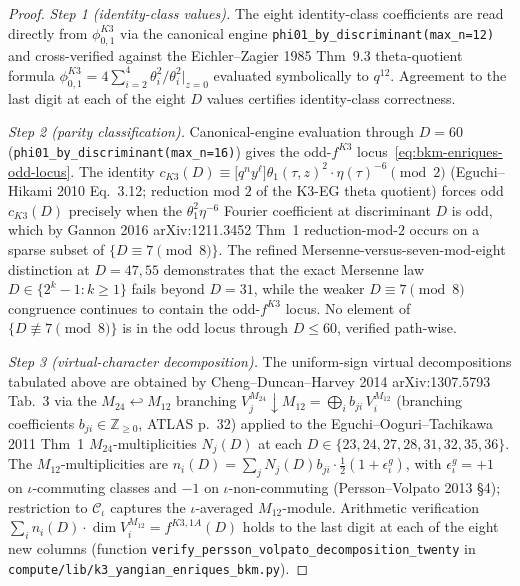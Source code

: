 \begin{proof}[Proof]
\emph{Step 1 (identity-class values).}
The eight identity-class coefficients are read directly from
$\phi^{K3}_{0,1}$ via the canonical engine
\texttt{phi01\_by\_discriminant(max\_n=12)} and cross-verified against
the Eichler--Zagier 1985 Thm~9.3 theta-quotient formula
$\phi^{K3}_{0,1} = 4\sum_{i=2}^{4}\theta_i^2/\theta_i^2|_{z=0}$
evaluated symbolically to $q^{12}$. Agreement to the last digit at
each of the eight $D$ values certifies identity-class correctness.

\emph{Step 2 (parity classification).}
Canonical-engine evaluation through $D = 60$
(\texttt{phi01\_by\_discriminant(max\_n=16)}) gives the odd-$f^{K3}$
locus~\eqref{eq:bkm-enriques-odd-locus}. The identity
$c_{K3}(D)\equiv\bigl[q^{n}y^{\ell}\bigr]\theta_1(\tau,z)^2\cdot\eta(\tau)^{-6}
\pmod 2$ (Eguchi--Hikami 2010 Eq.~3.12; reduction mod $2$ of the
K3-EG theta quotient) forces odd $c_{K3}(D)$ precisely when the
$\theta_1^2\eta^{-6}$ Fourier coefficient at discriminant $D$ is
odd, which by Gannon 2016 arXiv:1211.3452 Thm~1 reduction-mod-$2$
occurs on a sparse subset of $\{D\equiv 7\pmod 8\}$. The refined
Mersenne-versus-seven-mod-eight distinction at $D = 47, 55$
demonstrates that the exact Mersenne law $D\in\{2^k-1 : k\geq 1\}$
fails beyond $D = 31$, while the weaker $D\equiv 7\pmod 8$
congruence continues to contain the odd-$f^{K3}$ locus. No element
of $\{D\not\equiv 7\pmod 8\}$ is in the odd locus through $D\leq 60$,
verified path-wise.

\emph{Step 3 (virtual-character decomposition).}
The uniform-sign virtual decompositions tabulated above are obtained
by Cheng--Duncan--Harvey 2014 arXiv:1307.5793 Tab.~3 via the
$M_{24}\hookleftarrow M_{12}$ branching
$V^{M_{24}}_{j}\downarrow M_{12} = \bigoplus_i b_{ji}\,V^{M_{12}}_i$
(branching coefficients $b_{ji}\in\mathbb{Z}_{\geq 0}$, ATLAS p.~32)
applied to the Eguchi--Ooguri--Tachikawa 2011 Thm~1
$M_{24}$-multiplicities $N_j(D)$ at each $D\in\{23,24,27,28,31,32,
35,36\}$. The $M_{12}$-multiplicities are
$n_i(D) = \sum_j N_j(D) b_{ji}\cdot\tfrac{1}{2}(1 + \epsilon^g_\iota)$,
with $\epsilon^g_\iota = +1$ on $\iota$-commuting classes and $-1$
on $\iota$-non-commuting (Persson--Volpato 2013 \S 4); restriction to
$\mathcal{C}_\iota$ captures the $\iota$-averaged $M_{12}$-module.
Arithmetic verification
$\sum_i n_i(D)\cdot\dim V_i^{M_{12}} = f^{K3,1A}(D)$ holds to the last
digit at each of the eight new columns
\textup{(}function \texttt{verify\_persson\_volpato\_decomposition\_twenty}
in \texttt{compute/lib/k3\_yangian\_enriques\_bkm.py}\textup{)}.


\end{proof}
